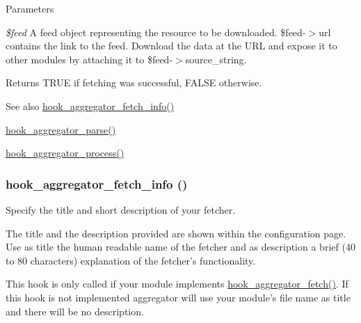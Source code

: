 \begin{DoxyParams}{Parameters}
\item[{\em \$feed}]A feed object representing the resource to be downloaded. \$feed-\/$>$url contains the link to the feed. Download the data at the URL and expose it to other modules by attaching it to \$feed-\/$>$source\_\-string.\end{DoxyParams}
\begin{DoxyReturn}{Returns}
TRUE if fetching was successful, FALSE otherwise.
\end{DoxyReturn}
\begin{DoxySeeAlso}{See also}
\hyperlink{group__hooks_gaa9eb0b672b7f66eb5aaccf27e8ff995f}{hook\_\-aggregator\_\-fetch\_\-info()} 

\hyperlink{group__hooks_gae27163e729bb531cc527ec6f0ad16943}{hook\_\-aggregator\_\-parse()} 

\hyperlink{group__hooks_gaf5da0f420ab3b27c1bc33f339c979ac7}{hook\_\-aggregator\_\-process()} 
\end{DoxySeeAlso}
\hypertarget{group__hooks_gaa9eb0b672b7f66eb5aaccf27e8ff995f}{
\subsubsection[{hook\_\-aggregator\_\-fetch\_\-info}]{\setlength{\rightskip}{0pt plus 5cm}hook\_\-aggregator\_\-fetch\_\-info ()}}
\label{group__hooks_gaa9eb0b672b7f66eb5aaccf27e8ff995f}
Specify the title and short description of your fetcher.

The title and the description provided are shown within the configuration page. Use as title the human readable name of the fetcher and as description a brief (40 to 80 characters) explanation of the fetcher's functionality.

This hook is only called if your module implements \hyperlink{group__hooks_ga459db08cc062e9ea3bf1f526daf91a4a}{hook\_\-aggregator\_\-fetch()}. If this hook is not implemented aggregator will use your module's file name as title and there will be no description.

